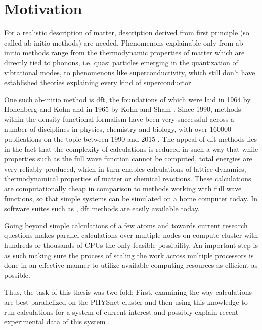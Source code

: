 \documentclass[main.tex]{subfiles}
\begin{document}
\chapter{Motivation}

For a realistic description of matter, description derived from first principle (so called ab-initio methods) are needed.
Phenomenons explainable only from ab-initio methods range from the thermodynamic properties of matter which are directly tied to phonons, i.e. quasi particles emerging in the quantization of vibrational modes, to phenomenons like superconductivity, which still don't have established theories explaining every kind of superconductor.

One such ab-initio method is \gls{dft}, the foundations of which were laid in 1964 by Hohenberg and Kohn \cite{hohenberg_inhomogeneous_1964} and in 1965 by Kohn and Sham \cite{kohn_self-consistent_1965}.
Since 1990, methods within the density functional formalism have been very successful across a number of disciplines in physics, chemistry and biology, with over \num{160000} publications on the topic between 1990 and 2015 \cite{jones_density_2015}.
The appeal of \gls{dft} methods lies in the fact that the complexity of calculations is reduced in such a way that while properties such as the full wave function cannot be computed, total energies are very reliably produced, which in turn enables calculations of lattice dynamics, thermodynamical properties of matter or chemical reactions.
These calculations are computationally cheap in comparison to methods working with full wave functions, so that simple systems can be simulated on a home computer today.
In software suites such as \QE \cite{giannozzi_quantum_2009,giannozzi_advanced_2017}, \gls{dft} methods are easily available today.

Going beyond simple calculations of a few atoms and towards current research questions makes parallel calculations over multiple nodes on compute cluster with hundreds or thousands of CPUs the only feasible possibility.
An important step is as such making sure the process of scaling the work across multiple processors is done in an effective manner to utilize available computing resources as efficient as possible.

Thus, the task of this thesis was two-fold:
First, examining the way \QE calculations are best parallelized on the PHYSnet cluster and then using this knowledge to run calculations for a system of current interest and possibly explain recent experimental data of this system \cite{hall_environmental_2019}.
\end{document}
